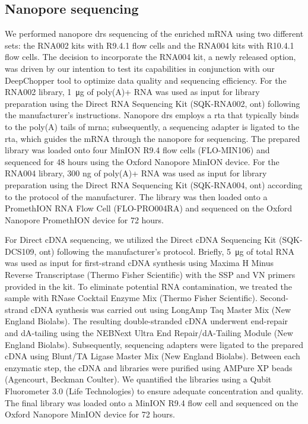 \documentclass[pdflatex,sn-nature, lineno]{sn-jnl}%
\begin{document}
\subsection{Nanopore sequencing}

We performed nanopore \gls{drs} sequencing of the enriched mRNA using two different sets: the RNA002 kits with R9.4.1 flow cells and the RNA004 kits with R10.4.1 flow cells.
The decision to incorporate the RNA004 kit, a newly released option, was driven by our intention to test its capabilities in conjunction with our DeepChopper tool to optimize data quality and sequencing efficiency.
For the RNA002 library, \SI{1}{\micro\gram} of poly(A)+ RNA was used as input for library preparation using the Direct RNA Sequencing Kit (SQK-RNA002, \gls{ont}) following the manufacturer's instructions.
Nanopore \gls{drs} employs a \gls{rta} that typically binds to the poly(A) tails of \gls{mrna}; subsequently, a sequencing adapter is ligated to the \gls{rta}, which guides the mRNA through the nanopore for sequencing.
The prepared library was loaded onto four MinION R9.4 flow cells (FLO-MIN106) and sequenced for 48 hours using the Oxford Nanopore MinION device.
For the RNA004 library, 300 ng of poly(A)+ RNA was used as input for library preparation using the Direct RNA Sequencing Kit (SQK-RNA004, \gls{ont}) according to the protocol of the manufacturer.
The library was then loaded onto a PromethION RNA Flow Cell (FLO-PRO004RA) and sequenced on the Oxford Nanopore PromethION device for 72 hours.

For Direct cDNA sequencing, we utilized the Direct cDNA Sequencing Kit (SQK-DCS109, \gls{ont}) following the manufacturer's protocol.
Briefly, \SI{5}{\micro\gram}  of total RNA was used as input for first-strand cDNA synthesis using Maxima H Minus Reverse Transcriptase (Thermo Fisher Scientific) with the SSP and VN primers provided in the kit.
To eliminate potential RNA contamination, we treated the sample with RNase Cocktail Enzyme Mix (Thermo Fisher Scientific).
Second-strand cDNA synthesis was carried out using LongAmp Taq Master Mix (New England Biolabs).
The resulting double-stranded cDNA underwent end-repair and dA-tailing using the NEBNext Ultra End Repair/dA-Tailing Module (New England Biolabs).
Subsequently, sequencing adapters were ligated to the prepared cDNA using Blunt/TA Ligase Master Mix (New England Biolabs).
Between each enzymatic step, the cDNA and libraries were purified using AMPure XP beads (Agencourt, Beckman Coulter).
We quantified the libraries using a Qubit Fluorometer 3.0 (Life Technologies) to ensure adequate concentration and quality.
The final library was loaded onto a MinION R9.4 flow cell and sequenced on the Oxford Nanopore MinION device for 72 hours.
\end{document}
